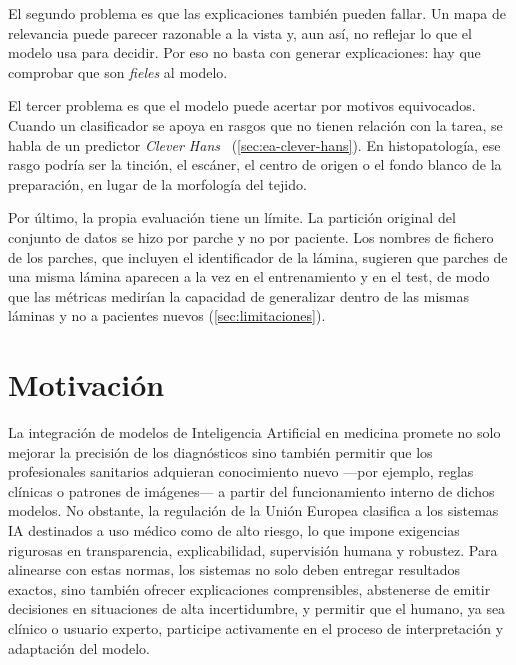 El segundo problema es que las explicaciones también pueden fallar. Un mapa de relevancia puede parecer razonable a la vista y, aun así, no reflejar lo que el modelo usa para decidir. Por eso no basta con generar explicaciones: hay que comprobar que son \emph{fieles} al modelo.

El tercer problema es que el modelo puede acertar por motivos equivocados. Cuando un clasificador se apoya en rasgos que no tienen relación con la tarea, se habla de un predictor \emph{Clever Hans}~\cite{lapuschkin2019} (\cref{sec:ea-clever-hans}). En histopatología, ese rasgo podría ser la tinción, el escáner, el centro de origen o el fondo blanco de la preparación, en lugar de la morfología del tejido.

Por último, la propia evaluación tiene un límite. La partición original del conjunto de datos se hizo por parche y no por paciente. Los nombres de fichero de los parches, que incluyen el identificador de la lámina, sugieren que parches de una misma lámina aparecen a la vez en el entrenamiento y en el test, de modo que las métricas medirían la capacidad de generalizar dentro de las mismas láminas y no a pacientes nuevos (\cref{sec:limitaciones}).

\section{Motivación}\label{sec:motivacion}

La integración de modelos de Inteligencia Artificial en medicina promete no solo mejorar la precisión de los diagnósticos sino también permitir que los profesionales sanitarios adquieran conocimiento nuevo ---por ejemplo, reglas clínicas o patrones de imágenes--- a partir del funcionamiento interno de dichos modelos. No obstante, la regulación de la Unión Europea clasifica a los sistemas IA destinados a uso médico como de alto riesgo, lo que impone exigencias rigurosas en transparencia, explicabilidad, supervisión humana y robustez. Para alinearse con estas normas, los sistemas no solo deben entregar resultados exactos, sino también ofrecer explicaciones comprensibles, abstenerse de emitir decisiones en situaciones de alta incertidumbre, y permitir que el humano, ya sea clínico o usuario experto, participe activamente en el proceso de interpretación y adaptación del modelo.

